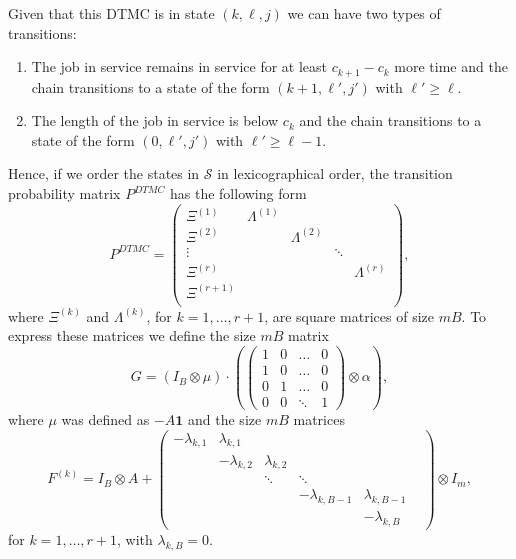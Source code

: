 \documentclass[12pt]{report}
\begin{document}
Given that this DTMC is in state $(k,\ell,j)$ we can have two types of transitions:
\begin{enumerate} 
\item The job in service remains in service for at least $c_{k+1}-c_k$ more time and the chain 
transitions to a state of the form $(k+1,\ell',j')$ with $\ell' \geq \ell$.
\item The length of the job in service is below $c_k$ and 
the chain transitions to a state of the form $(0,\ell',j')$ with $\ell' \geq \ell-1$.
\end{enumerate} 
Hence, if we order the states in $\mathcal{S}$ in lexicographical order,
the transition probability matrix $P^{DTMC}$ has the following form
\begin{equation}\label{eq:PDTMC}
P^{DTMC} = \begin{pmatrix}
\Xi^{(1)} & \Lambda^{(1)} &  & &  \\
\Xi^{(2)} &  & \Lambda^{(2)} & & \\
 \vdots &  & & \ddots &  \\
\Xi^{(r)} & & &  & \Lambda^{(r)}  \\
\Xi^{(r+1)} & & & &    \\
\end{pmatrix},
\end{equation}
where $\Xi^{(k)}$ and $\Lambda^{(k)}$, for $k=1,\ldots,r+1$, are
square matrices of size $mB$.
To express these matrices we define the size $mB$ matrix
\begin{equation}\label{eq:G}
G = (I_B \otimes \mu) \cdot \left( \begin{pmatrix}
1 & 0 & \dots & 0\\
1 & 0 & \dots & 0\\
0 & 1 & \dots & 0\\
0 & 0 & \ddots & 1
\end{pmatrix}
\otimes \alpha \right),
\end{equation}
where $\mu$ was defined as $-A \textbf{1}$ and the size $mB$ matrices
\begin{equation}\label{eq:Fk}
F^{(k)} = I_{B} \otimes A + \begin{pmatrix}
-\lambda_{k,1} & \lambda_{k,1} & & & & \\
& -\lambda_{k,2} & \lambda_{k,2} & & & \\
& & \ddots & \ddots & & \\
& & & -\lambda_{k, B-1} & \lambda_{k,B-1} &\\
& & & & -\lambda_{k, B} &
\end{pmatrix} \otimes I_m,
\end{equation}
for $k=1,\ldots,r+1$, with $\lambda_{k,B} = 0$. 
\end{document}
